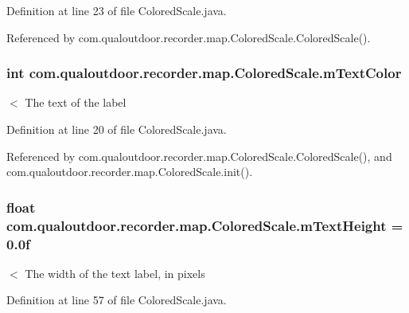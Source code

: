 Definition at line 23 of file Colored\-Scale.\-java.



Referenced by com.\-qualoutdoor.\-recorder.\-map.\-Colored\-Scale.\-Colored\-Scale().

\hypertarget{classcom_1_1qualoutdoor_1_1recorder_1_1map_1_1ColoredScale_ad44c4a8f10141db919a6c1f023200b6f}{
\subsubsection[{m\-Text\-Color}]{\setlength{\rightskip}{0pt plus 5cm}int com.\-qualoutdoor.\-recorder.\-map.\-Colored\-Scale.\-m\-Text\-Color\hspace{0.3cm}{\ttfamily [private]}}}\label{classcom_1_1qualoutdoor_1_1recorder_1_1map_1_1ColoredScale_ad44c4a8f10141db919a6c1f023200b6f}
$<$ The text of the label 

Definition at line 20 of file Colored\-Scale.\-java.



Referenced by com.\-qualoutdoor.\-recorder.\-map.\-Colored\-Scale.\-Colored\-Scale(), and com.\-qualoutdoor.\-recorder.\-map.\-Colored\-Scale.\-init().

\hypertarget{classcom_1_1qualoutdoor_1_1recorder_1_1map_1_1ColoredScale_a86eef0d17d57905f4816680963300ca3}{
\subsubsection[{m\-Text\-Height}]{\setlength{\rightskip}{0pt plus 5cm}float com.\-qualoutdoor.\-recorder.\-map.\-Colored\-Scale.\-m\-Text\-Height = 0.\-0f\hspace{0.3cm}{\ttfamily [private]}}}\label{classcom_1_1qualoutdoor_1_1recorder_1_1map_1_1ColoredScale_a86eef0d17d57905f4816680963300ca3}
$<$ The width of the text label, in pixels 

Definition at line 57 of file Colored\-Scale.\-java.




